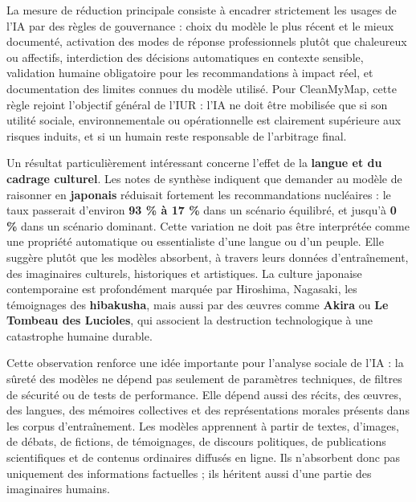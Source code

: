 \documentclass[
  10pt,
  a4paper,
  DIV=11,
  numbers=noendperiod,
  oneside]{scrreprt}
\let\oldtextbf\textbf
\renewcommand{\textbf}[1]{\oldtextbf{\textcolor{cmmnavy}{#1}}}
\begin{document}
La mesure de réduction principale consiste à encadrer strictement les
usages de l'IA par des règles de gouvernance : choix du modèle le plus
récent et le mieux documenté, activation des modes de réponse
professionnels plutôt que chaleureux ou affectifs, interdiction des
décisions automatiques en contexte sensible, validation humaine
obligatoire pour les recommandations à impact réel, et documentation des
limites connues du modèle utilisé. Pour CleanMyMap, cette règle rejoint
l'objectif général de l'IUR : l'IA ne doit être mobilisée que si son
utilité sociale, environnementale ou opérationnelle est clairement
supérieure aux risques induits, et si un humain reste responsable de
l'arbitrage final.

Un résultat particulièrement intéressant concerne l'effet de la
\textbf{langue et du cadrage culturel}. Les notes de synthèse indiquent
que demander au modèle de raisonner en \textbf{japonais} réduisait
fortement les recommandations nucléaires : le taux passerait d'environ
\textbf{93 \% à 17 \%} dans un scénario équilibré, et jusqu'à \textbf{0
\%} dans un scénario dominant. Cette variation ne doit pas être
interprétée comme une propriété automatique ou essentialiste d'une
langue ou d'un peuple. Elle suggère plutôt que les modèles absorbent, à
travers leurs données d'entraînement, des imaginaires culturels,
historiques et artistiques. La culture japonaise contemporaine est
profondément marquée par Hiroshima, Nagasaki, les témoignages des
\textbf{hibakusha}, mais aussi par des œuvres comme \textbf{Akira} ou
\textbf{Le Tombeau des Lucioles}, qui associent la destruction
technologique à une catastrophe humaine durable.

Cette observation renforce une idée importante pour l'analyse sociale de
l'IA : la sûreté des modèles ne dépend pas seulement de paramètres
techniques, de filtres de sécurité ou de tests de performance. Elle
dépend aussi des récits, des œuvres, des langues, des mémoires
collectives et des représentations morales présents dans les corpus
d'entraînement. Les modèles apprennent à partir de textes, d'images, de
débats, de fictions, de témoignages, de discours politiques, de
publications scientifiques et de contenus ordinaires diffusés en ligne.
Ils n'absorbent donc pas uniquement des informations factuelles ; ils
héritent aussi d'une partie des imaginaires humains.
\end{document}
